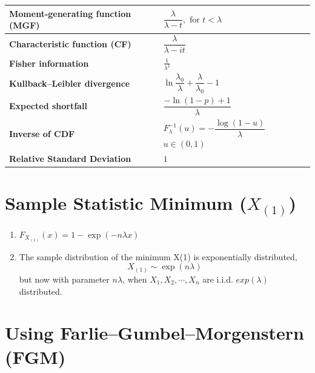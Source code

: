 \begin{alternateColorTable}
\begin{longtable}{|m{6cm}|p{9cm}|}
    \textbf{Moment-generating function (MGF)} &
    ${\displaystyle {\dfrac {\lambda }{\lambda -t}},{\text{ for }}t<\lambda }$
    \\[1ex] \hline

    \textbf{Characteristic function (CF)} &
    ${\displaystyle {\dfrac {\lambda }{\lambda -it}}}$
    \\[1ex] \hline

    \textbf{Fisher information} &
    ${\displaystyle {\frac {1}{\lambda ^{2}}}}$
    \\[1ex] \hline

    \textbf{Kullback–Leibler divergence} &
    ${\displaystyle \ln {\dfrac {\lambda _{0}}{\lambda }}+{\dfrac {\lambda }{\lambda _{0}}}-1}$
    \\[1ex] \hline

    \textbf{Expected shortfall} &
    ${\displaystyle {\dfrac {-\ln(1-p)+1}{\lambda }}}$
    \\[1ex] \hline

    \textbf{Inverse of CDF \cite{ism-1}} &
    $F_\lambda^{-1}(u) = -\dfrac{\log(1-u)}{\lambda}$ $u \in (0,1)$
    \\[1ex] \hline

    \textbf{Relative Standard Deviation} &
    $1$
    \\[1ex] \hline

\end{longtable}
\renewcommand{\arraystretch}{1}
\end{alternateColorTable}


\section{Sample Statistic Minimum ($X_{(1)}$) \cite{ism-1}} \label{Exponential Distribution: Sample Statistic Minimum}

\begin{enumerate}
    \item $F_{X_{(1)}}(x) = 1 - \exp(-n\lambda x)$

    \item The sample distribution of the minimum X(1) is exponentially distributed, 
    \[
        X_{(1)} \sim \exp(n\lambda)
    \]
    but now with parameter $n\lambda$, when $X_1,X_2,\cdots, X_n$ are i.i.d. $exp(\lambda)$ distributed.
    
\end{enumerate}


\section{Using Farlie–Gumbel–Morgenstern (FGM) \cite{ism-1}} \label{Sample Statistic Minimum: Using Farlie–Gumbel–Morgenstern (FGM)}

